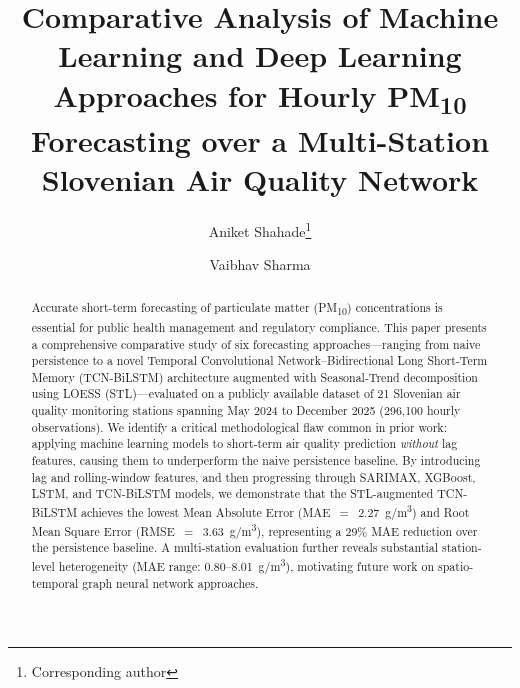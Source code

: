\documentclass[runningheads]{llncs}
\begin{document}
\title{Comparative Analysis of Machine Learning and Deep Learning
       Approaches for Hourly PM\textsubscript{10} Forecasting
       over a Multi-Station Slovenian Air Quality Network}


\author{Aniket Shahade\thanks{Corresponding author} \and
Vaibhav Sharma}



\maketitle

\begin{abstract}
Accurate short-term forecasting of particulate matter (PM\textsubscript{10})
concentrations is essential for public health management and regulatory
compliance. This paper presents a comprehensive comparative study of six
forecasting approaches—ranging from naive persistence to a novel
Temporal Convolutional Network–Bidirectional Long Short-Term Memory
(TCN-BiLSTM) architecture augmented with Seasonal-Trend decomposition
using LOESS (STL)—evaluated on a publicly available dataset of 21
Slovenian air quality monitoring stations spanning May 2024 to December
2025 (296{,}100 hourly observations). We identify a critical methodological
flaw common in prior work: applying machine learning models to short-term
air quality prediction \emph{without} lag features, causing them to
underperform the naive persistence baseline. By introducing lag and
rolling-window features, and then progressing through SARIMAX, XGBoost,
LSTM, and TCN-BiLSTM models, we demonstrate that the STL-augmented
TCN-BiLSTM achieves the lowest Mean Absolute Error (MAE~$=$~2.27~\textmu{}g/m\textsuperscript{3})
and Root Mean Square Error (RMSE~$=$~3.63~\textmu{}g/m\textsuperscript{3}),
representing a 29\% MAE reduction over the persistence baseline. A
multi-station evaluation further reveals substantial station-level
heterogeneity (MAE range: 0.80–8.01~\textmu{}g/m\textsuperscript{3}),
motivating future work on spatio-temporal graph neural network approaches.

\end{abstract}
\end{document}
